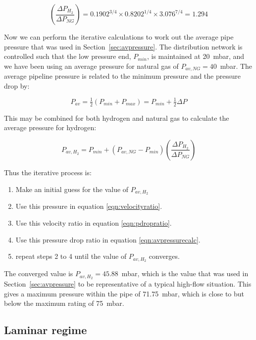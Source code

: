 \documentclass[5p]{elsarticle} %
\begin{document}
\begin{equation}
\label{eqn:pdropratiovalue}
    \left(\frac{\Delta P_{H_2}}{\Delta P_{NG}}\right) = 
    0.1902^{3/4} \times 0.8202^{1/4} \times 3.076^{7/4} = \mathbf{1.294}
\end{equation}

Now we can perform the iterative calculations to work out the average pipe pressure that was used in Section~\ref{sec:avpressure}. 
The distribution network is controlled such that the low pressure end, $P_{min}$, is maintained at 20~mbar\citep{dodds2013}, and we have been using an average pressure for natural gas of $P_{av,NG}=40$~mbar\citep{utonomy23}.
The average pipeline pressure is related to the minimum pressure and the pressure drop by:

\begin{equation}
    \label{eqn:avpressure}
    P_{av} = \tfrac{1}{2}(P_{min}+P_{max}) = P_{min} + \tfrac{1}{2} \Delta P
\end{equation}

This may be combined for both hydrogen and natural gas to calculate the average pressure for hydrogen:

\begin{equation}
    \label{eqn:avpressurecalc}
    P_{av,H_2} = P_{min} + ( P_{av,NG} - P_{min} ) \left(\frac{\Delta P_{H_2}}{\Delta P_{NG}}\right)
\end{equation}

Thus the iterative process is:
\begin{enumerate}
    \item Make an initial guess for the value of $P_{av,H_2}$
    \item Use this pressure in equation \eqref{eqn:velocityratio}.
    \item Use this velocity ratio in equation \eqref{eqn:pdropratio}.
    \item Use this pressure drop ratio in equation \eqref{eqn:avpressurecalc}.
    \item repeat steps 2 to 4 until the value of $P_{av,H_2}$ converges.
\end{enumerate}

The converged value is $P_{av,H_2}=45.88$~mbar, which is the value that was used in Section~\ref{sec:avpressure} to be representative of a typical high-flow situation. 
This gives a maximum pressure within the pipe of 71.75~mbar, which is close to but below the maximum rating of 75~mbar\citep{dodds2013}.

\subsection{Laminar regime}
\label{sec:laminarturbulent}
\end{document}
